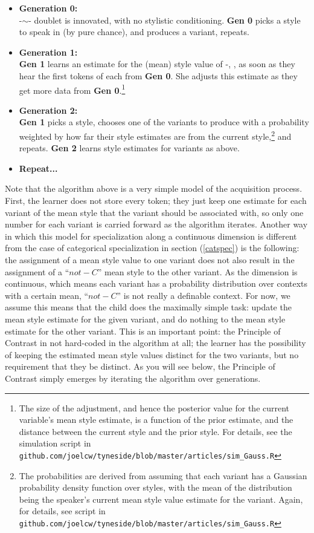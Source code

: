 \begin{itemize}
		\item[ ]\textbf{Generation 0:}\\  -$\sim$- doublet is innovated, with no stylistic conditioning. \textbf{Gen 0} picks a style to speak in (by pure chance), and produces a variant, repeats. 
		\item[ ]\textbf{Generation 1:}\\  \textbf{Gen 1} learns an estimate for the (mean) style value of -, , as soon as they hear the first tokens of each from \textbf{Gen 0}. She adjusts this estimate as they get more data from \textbf{Gen 0}.\footnote{The size of the adjustment, and hence the posterior value for the current variable's mean style estimate, is a function of the prior estimate, and the distance between the current style and the prior style. For details, see the simulation script in \texttt{github.com/joelcw/tyneside/blob/master/articles/sim\_Gauss.R}}
		\item[ ]\textbf{Generation 2:}\\ \textbf{Gen 1} picks a style, chooses one of the variants to produce with a probability weighted by how far their style estimates are from the current style,\footnote{The probabilities are derived from assuming that each variant has a Gaussian probability density function over styles, with the mean of the distribution being the speaker's current mean style value estimate for the variant. Again, for details, see script in \texttt{github.com/joelcw/tyneside/blob/master/articles/sim\_Gauss.R}} and repeats. \textbf{Gen 2} learns style estimates for variants as above.
		\item[ ]\textbf{Repeat...}
\end{itemize}

Note that the algorithm above is a very simple model of the acquisition process.
First, the learner does not store every token; they just keep one estimate for each variant of the mean style that the variant should be associated with, so only one number for each variant is carried forward as the algorithm iterates.
Another way in which this model for specialization along a continuous dimension is different from the case of categorical specialization in section (\ref{catspec}) is the following: the assignment of a mean style value to one variant does not also result in the assignment of a ``$not-C$'' mean style to the other variant.
As the dimension is continuous, which means each variant has a probability distribution over contexts with a certain mean, ``$not-C$'' is not really a definable context.
For now, we assume this means that the child does the maximally simple task: update the mean style estimate for the given variant, and do nothing to the mean style estimate for the other variant.
This is an important point: the Principle of Contrast in not hard-coded in the algorithm at all; the learner has the possibility of keeping the estimated mean style values distinct for the two variants, but no requirement that they be distinct.
As you will see below, the Principle of Contrast simply emerges by iterating the algorithm over generations.

